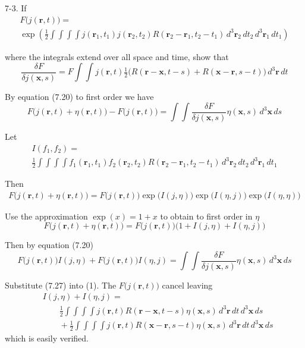 \documentclass[12pt]{article}
\begin{document}
7-3.
If
\begin{multline*}
F\big(j(\mathbf r,t)\big)=
\\
\exp\left(
\frac{1}{2}\int\int\int\int
j(\mathbf r_1,t_1)j(\mathbf r_2,t_2)R(\mathbf r_2-\mathbf r_1,t_2-t_1)
\,d^3\mathbf r_2\,dt_2\,d^3\mathbf r_1\,dt_1
\right)
\end{multline*}

where the integrals extend over all space and time, show that
\begin{equation*}
\frac{\delta F}{\delta j(\mathbf x,s)}
=F\int\int j(\mathbf r,t)
\tfrac{1}{2}
\big(R(\mathbf r-\mathbf x,t-s)+R(\mathbf x-\mathbf r,s-t)\big)
\,d^3\mathbf r\,dt
\tag{7.27}
\end{equation*}

By equation (7.20) to first order we have
\begin{equation*}
F\big(j(\mathbf r,t)+\eta(\mathbf r,t)\big)
-F\big(j(\mathbf r,t)\big)
=\int\int
\frac{\delta F}{\delta j(\mathbf x,s)}\eta(\mathbf x,s)\,d^3\mathbf x\,ds
\end{equation*}

Let
\begin{multline*}
I(f_1,f_2)=
\\
\frac{1}{2}
\int\int\int\int
f_1(\mathbf r_1,t_1)f_2(\mathbf r_2,t_2)R(\mathbf r_2-\mathbf r_1,t_2-t_1)
\,d^3\mathbf r_2\,dt_2\,d^3\mathbf r_1\,dt_1
\end{multline*}

Then
\begin{align*}
F\big(j(\mathbf r,t)+\eta(\mathbf r,t)\big)=F\big(j(\mathbf r,t)\big)
\exp\big(I(j,\eta)\big)\exp\big(I(\eta,j)\big)\exp\big(I(\eta,\eta)\big)
\end{align*}

Use the approximation $\exp(x)=1+x$ to obtain to first order in $\eta$
\begin{equation*}
F\big(j(\mathbf r,t)+\eta(\mathbf r,t)\big)
=F\big(j(\mathbf r,t)\big)\big(1+I(j,\eta)+I(\eta,j)\big)
\end{equation*}

Then by equation (7.20)
\begin{equation*}
F\big(j(\mathbf r,t)\big)I(j,\eta)+F\big(j(\mathbf r,t)\big)I(\eta,j)
=\int\int
\frac{\delta F}{\delta j(\mathbf x,s)}\eta(\mathbf x,s)\,d^3\mathbf x\,ds
\tag{1}
\end{equation*}

Substitute (7.27) into (1).
The $F\big(j(\mathbf r,t)\big)$ cancel leaving
\begin{align*}
&I(j,\eta)+I(\eta,j)=
\\
&\qquad\frac{1}{2}\int\int\int\int
j(\mathbf r,t)R(\mathbf r-\mathbf x,t-s)\eta(\mathbf x,s)\,d^3\mathbf r\,dt\,d^3\mathbf x\,ds
\\
&\qquad{}+\frac{1}{2}\int\int\int\int
j(\mathbf r,t)R(\mathbf x-\mathbf r,s-t)\eta(\mathbf x,s)\,d^3\mathbf r\,dt\,d^3\mathbf x\,ds
\end{align*}
which is easily verified.
\end{document}
